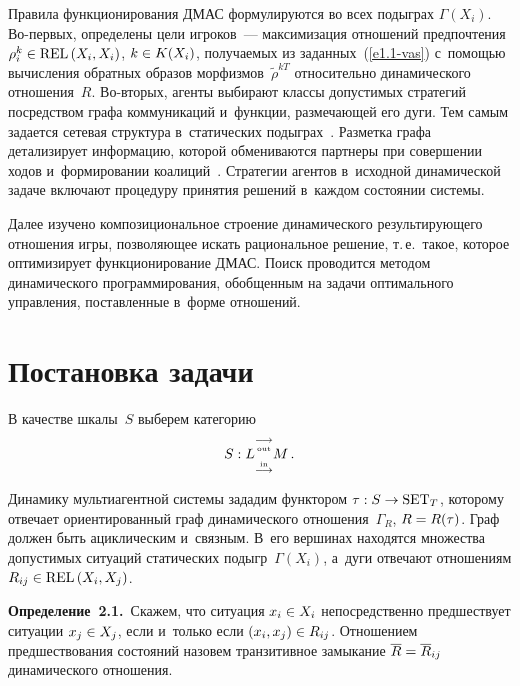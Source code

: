 \begin{multicols}{2}
    Правила функционирования ДМАС формулируются во всех подыграх 
$\Gamma(X_i)$. Во-пер\-вых, определены цели игроков~--- максимизация 
отношений предпочтения $\rho_i^k\hm\in \mathrm{REL}\left( X_i, X_i\right)$, $k\hm\in 
K(X_i)$, по\-лу\-ча\-емых из заданных~(\ref{e1.1-vas}) с~по\-мощью вы\-чис\-ле\-ния 
обратных образов морфизмов~$\tilde{\rho}^{kT}$ относительно динамического 
отношения~$R$. Во-вто\-рых, агенты выбирают классы допустимых стратегий 
посредством графа коммуникаций и~функции, размечающей его дуги. Тем самым 
задается сетевая структура в~статических подыграх~\cite{12-vas, 13-vas}. Разметка 
графа детализирует информацию, которой обмениваются партнеры при совершении 
ходов и~формировании коалиций~\cite{5-vas}. Стратегии агентов в~исходной 
динамической задаче включают процедуру принятия решений в~каж\-дом состоянии 
сис\-темы. 
    
    Далее изучено композициональное стро\-ение динамического результирующего 
отношения игры, поз\-во\-ля\-ющее искать рациональное решение, т.\,е.\ такое, которое 
оптимизирует функционирование ДМАС. Поиск проводится методом 
динамического программирования, обоб\-щен\-ным на задачи оптимального 
управ\-ле\-ния, по\-став\-лен\-ные в~форме отношений. 

\section{Постановка задачи}

    В качестве шкалы~$S$ выберем категорию 
    \begin{equation}
 S: L \overset{\underset{\mathrm{out}}{\longrightarrow}}{\underset{\overset{\mathrm{in}}{\longrightarrow}}
 {\vphantom{{\mbox{\scriptsize{$\circ$}}}} \ }} M\,.
    \label{e2.1-vas}
    \end{equation}
    
    Динамику мультиагентной системы зададим функтором $\tau: S\hm\to \mathrm{SET}_T$, 
которому отвечает ориентированный граф динамического отношения~$\Gamma_R$, 
$R\hm=R(\tau)$. Граф должен быть ацик\-ли\-че\-ским и~связ\-ным. В~его вершинах 
находятся множества до\-пус\-ти\-мых ситуаций статических подыгр~$\Gamma(X_i)$, 
а~дуги отвечают отношениям $R_{ij}\hm\in \mathrm{REL}\left( X_i, X_j\right)$. 
    
    \smallskip
    
    \noindent
    \textbf{Определение~2.1.}\  Скажем, что ситуация $x_i\hm\in X_i$ 
непосредственно предшествует ситуации $x_j\hm\in X_j$, если и~только если $(x_i, 
x_j)\hm\in R_{ij}$. Отношением предшествования со\-сто\-яний назовем транзитивное 
замыкание $\overline{R}\hm= \overline{R}_{ij}$ динамического отношения. 
    

\end{multicols}
